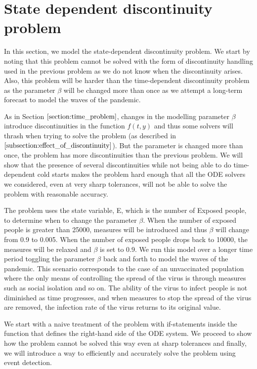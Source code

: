 \section{State dependent discontinuity problem}
In this section, we model the state-dependent discontinuity problem. We start by noting that this problem cannot be solved with the form of discontinuity handling used in the previous problem as we do not know when the discontinuity arises. Also, this problem will be harder than the time-dependent discontinuity problem as the parameter $\beta$ will be changed more than once as we attempt a long-term forecast to model the waves of the pandemic. 

As in Section $\ref{section:time_problem}$, changes in the modelling parameter $\beta$ introduce discontinuities in the function $f(t, y)$ and thus some solvers will thrash when trying to solve the problem (as described in $\ref{subsection:effect_of_discontinuity}$). But the parameter is changed more than once, the problem has more discontinuities than the previous problem. We will show that the presence of several discontinuities while not being able to do time-dependent cold starts makes the problem hard enough that all the ODE solvers we considered, even at very sharp tolerances, will not be able to solve the problem with reasonable accuracy.

The problem uses the state variable, E, which is the number of Exposed people, to determine when to change the parameter $\beta$. When the number of exposed people is greater than 25000, measures will be introduced and thus $\beta$ will change from 0.9 to 0.005. When the number of exposed people drops back to 10000, the measures will be relaxed and $\beta$ is set to 0.9. We run this model over a longer time period toggling the parameter $\beta$ back and forth to model the waves of the pandemic. This scenario corresponds to the case of an unvaccinated population where the only means of controlling the spread of the virus is through measures such as social isolation and so on. The ability of the virus to infect people is not diminished as time progresses, and when measures to stop the spread of the virus are removed, the infection rate of the virus returns to its original value.

We start with a naive treatment of the problem with if-statements inside the function that defines the right-hand side of the ODE system. We proceed to show how the problem cannot be solved this way even at sharp tolerances and finally, we will introduce a way to efficiently and accurately solve the problem using event detection.

